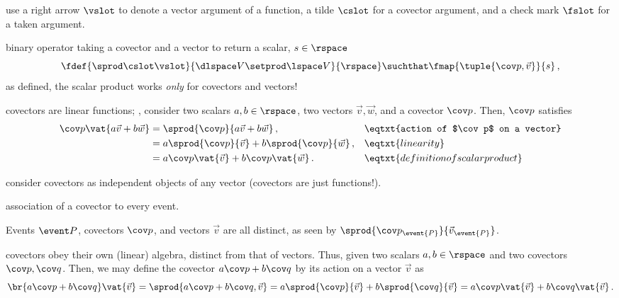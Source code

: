  use a right arrow $\vslot$ to denote a vector argument of a function, a tilde $\cslot$ for a covector argument, and a check mark $\fslot$ for a taken argument.

 binary operator taking a covector and a vector to return a scalar, $s\in\rspace$
%
\begin{equation*}
  \fdef{\sprod\cslot\vslot}{\dlspace V\setprod\lspace V}{\rspace}\suchthat\fmap{\tuple{\cov p, \vec v}}{s}\,,
\end{equation*}
%
 as defined, the scalar product works \emph{only} for covectors and vectors!

 covectors are linear functions; \ie, consider two scalars $a,b\in\rspace$, two vectors $\vec v,\vec w$, and a covector $\cov p$. Then, $\cov p$ satisfies
%
\begin{align}\label{eq:covectorpropertiesasmap}
  \cov p\vat{a\vec v + b\vec w} &= \sprod{\cov p}{a\vec v + b\vec w}                  \,, && \eqtxt{action of $\cov p$ on a vector} \\\nonumber
                                &= a\sprod{\cov p}{\vec v} + b\sprod{\cov p}{\vec w}  \,, && \eqtxt{linearity}              \\\nonumber
                                &= a\cov p\vat{\vec v} + b\cov p\vat{\vec w}          \,. && \eqtxt{definition of scalar product} \nonumber
\end{align}

 consider covectors as independent objects of any vector (covectors are just functions!).

 association of a covector to every event.

 Events $\event P$, covectors $\cov p$, and vectors $\vec v$ are all distinct, as seen by $\sprod{\cov p_\event{P}}{\vec v_\event{P}}$.

 covectors obey their own (linear) algebra, distinct from that of vectors. Thus, given two scalars $a,b\in\rspace$ and two covectors $\cov p,\cov q$. Then, we may define the covector $a\cov p + b\cov q$ by its action on a vector $\vec v$ as
%
\begin{equation}\label{eq:dualvectorspace}
  \br{a\cov p + b\cov q}\vat{\vec v} = \sprod{a\cov p + b\cov q, \vec v} 
                                     = a\sprod{\cov p}{\vec v} + b\sprod{\cov q}{\vec v}
                                     = a\cov p\vat{\vec v} + b\cov q\vat{\vec v}\,.
\end{equation}

